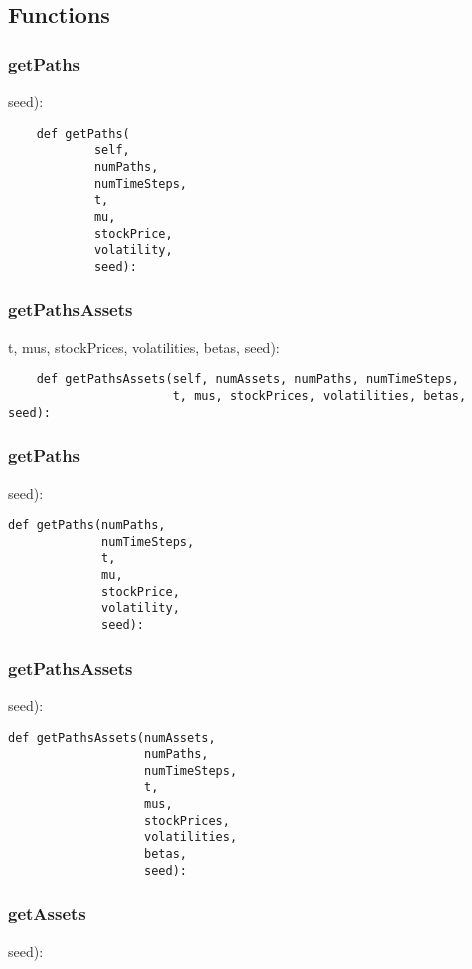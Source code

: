 \documentclass[twoside,11pt]{book}
\begin{document}
\subsection*{Functions}

\subsubsection*{{\bf getPaths}}
seed): 

\begin{lstlisting}
    def getPaths(
            self,
            numPaths,
            numTimeSteps,
            t,
            mu,
            stockPrice,
            volatility,
            seed):
\end{lstlisting}

\subsubsection*{{\bf getPathsAssets}}
t, mus, stockPrices, volatilities, betas, seed): 

\begin{lstlisting}
    def getPathsAssets(self, numAssets, numPaths, numTimeSteps,
                       t, mus, stockPrices, volatilities, betas, seed):
\end{lstlisting}

\subsubsection*{{\bf getPaths}}
seed): 

\begin{lstlisting}
def getPaths(numPaths,
             numTimeSteps,
             t,
             mu,
             stockPrice,
             volatility,
             seed):
\end{lstlisting}

\subsubsection*{{\bf getPathsAssets}}
seed): 

\begin{lstlisting}
def getPathsAssets(numAssets,
                   numPaths,
                   numTimeSteps,
                   t,
                   mus,
                   stockPrices,
                   volatilities,
                   betas,
                   seed):
\end{lstlisting}

\subsubsection*{{\bf getAssets}}
seed): 
\end{document}
